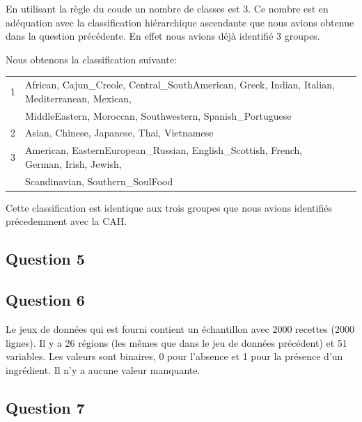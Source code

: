 \documentclass[a4paper,11pt,oneside,roman]{article}
\begin{document}
    En utilisant la règle du coude un nombre de classes est 3.
    Ce nombre est en adéquation avec la classification hiérarchique ascendante que nous avions obtenue dans la question précédente.
    En effet nous avions déjà identifié 3 groupes.

    Nous obtenons la classification suivante:
    \begin{center}
        \begin{tabular}{|l|l|l|}
            \hline
            1 & African, Cajun\_Creole, Central\_SouthAmerican, Greek, Indian, Italian, Mediterranean, Mexican, \\
            & MiddleEastern, Moroccan, Southwestern, Spanish\_Portuguese\\
            \hline
            2 & Asian, Chinese, Japanese, Thai, Vietnamese\\
            \hline
            3 & American, EasternEuropean\_Russian, English\_Scottish, French, German, Irish, Jewish,\\
            & Scandinavian, Southern\_SoulFood\\
            \hline
        \end{tabular}
    \end{center}
    Cette classification est identique aux trois groupes que nous avions identifiés précedemment avec la CAH.

    \subsection*{Question 5}

    \subsection*{Question 6}
    Le jeux de données qui est fourni contient un échantillon avec 2000 recettes (2000 lignes).
    Il y a 26 régions (les mêmes que dans le jeu de données précédent) et 51 variables.
    Les valeurs sont binaires, 0 pour l'absence et 1 pour la présence d'un ingrédient.
    Il n'y a aucune valeur manquante.
    
    \subsection*{Question 7}
    
    
\end{document}
